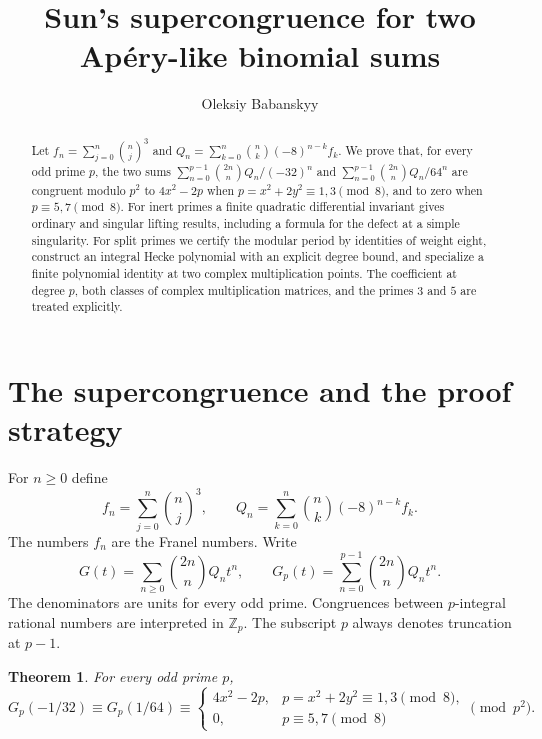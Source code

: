 \documentclass[11pt,a4paper]{article}
\title{Sun's supercongruence for two Ap\'ery-like binomial sums}
\author{Oleksiy Babanskyy}
\date{}
\newtheorem{theorem}{Theorem}[section]
\theoremstyle{remark}
\newcommand{\Z}{\mathbb Z}\newcommand{\Q}{\mathbb Q}
\begin{document}
\maketitle
\begin{abstract}
Let $f_n=\sum_{j=0}^n\binom nj^3$ and
$Q_n=\sum_{k=0}^n\binom nk(-8)^{n-k}f_k$.
We prove that, for every odd prime $p$, the two sums
$\sum_{n=0}^{p-1}\binom{2n}n Q_n/(-32)^n$ and
$\sum_{n=0}^{p-1}\binom{2n}n Q_n/64^n$
are congruent modulo $p^2$ to $4x^2-2p$ when
$p=x^2+2y^2\equiv1,3\pmod8$, and to zero when
$p\equiv5,7\pmod8$.
For inert primes a finite quadratic differential invariant gives ordinary
and singular lifting results, including a formula for the defect at a
simple singularity. For split primes we certify the modular period by
identities of weight eight, construct an integral Hecke polynomial with
an explicit degree bound, and specialize a finite polynomial identity
at two complex multiplication points. The coefficient at degree $p$,
both classes of complex multiplication matrices, and the primes $3$ and
$5$ are treated explicitly.
\end{abstract}

\section{The supercongruence and the proof strategy}\label{sec:intro}
For $n\ge0$ define
\begin{equation}\label{eq:sequences}
 f_n=\sum_{j=0}^n\binom nj^3,\qquad
 Q_n=\sum_{k=0}^n\binom nk(-8)^{n-k}f_k.
\end{equation}
The numbers $f_n$ are the Franel numbers. Write
\begin{equation}\label{eq:series-sums}
 G(t)=\sum_{n\ge0}\binom{2n}n Q_nt^n,\qquad
 G_p(t)=\sum_{n=0}^{p-1}\binom{2n}n Q_nt^n.
\end{equation}
The denominators are units for every odd prime. Congruences between
$p$-integral rational numbers are interpreted in $\Z_p$.
The subscript $p$ always denotes truncation at $p-1$.

\begin{theorem}\label{thm:main}
For every odd prime $p$,
\begin{equation}\label{eq:main}
 G_p(-1/32)\equiv G_p(1/64)\equiv
 \begin{cases}
 4x^2-2p,&p=x^2+2y^2\equiv1,3\pmod8,\\
 0,&p\equiv5,7\pmod8
 \end{cases}
 \pmod{p^2}.
\end{equation}
\end{theorem}
\end{document}
